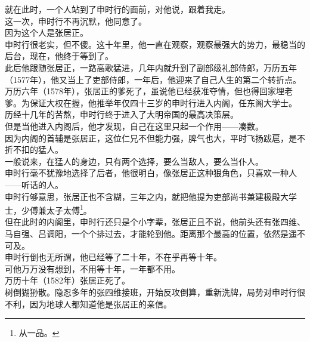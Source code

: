 \begin{multicols}{\theparacolNo}
就在此时，一个人站到了申时行的面前，对他说，跟着我走。\\

这一次，申时行不再沉默，他同意了。\\

因为这个人是张居正。\\

申时行很老实，但不傻。这十年里，他一直在观察，观察最强大的势力，最稳当的后台，现在，他终于等到了。\\

此后他跟随张居正，一路高歌猛进，几年内就升到了副部级礼部侍郎，万历五年（1577年），他又当上了吏部侍郎，一年后，他迎来了自己人生的第二个转折点。\\

万历六年（1578年），张居正的爹死了，虽说他已经获准夺情，但也得回家埋老爹。为保证大权在握，他推举年仅四十三岁的申时行进入内阁，任东阁大学士。\\

历经十几年的苦熬，申时行终于进入了大明帝国的最高决策层。\\

但是当他进入内阁后，他才发现，自己在这里只起一个作用——凑数。\\

因为内阁的首辅是张居正，这位仁兄不但能力强，脾气也大，平时飞扬跋扈，是不折不扣的猛人。\\

一般说来，在猛人的身边，只有两个选择，要么当敌人，要么当仆人。\\

申时行毫不犹豫地选择了后者，他很明白，像张居正这种狠角色，只喜欢一种人——听话的人。\\

申时行够意思，张居正也不含糊，三年之内，就把他提为吏部尚书兼建极殿大学士，少傅兼太子太傅\footnote{从一品。}。\\

但在此时的内阁里，申时行还只是个小字辈，张居正且不说，他前头还有张四维、马自强、吕调阳，一个个排过去，才能轮到他。距离那个最高的位置，依然是遥不可及。\\

申时行倒也无所谓，他已经等了二十年，不在乎再等十年。\\

可他万万没有想到，不用等十年，一年都不用。\\

万历十年（1582年）张居正死了。\\

树倒猢狲散。隐忍多年的张四维接班，开始反攻倒算，重新洗牌，局势对申时行很不利，因为地球人都知道他是张居正的亲信。\\


\end{multicols}
